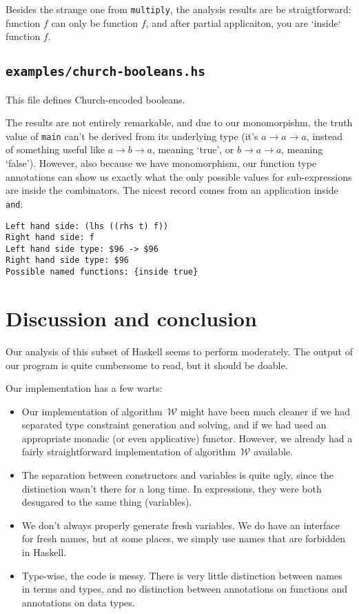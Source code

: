 \documentclass[a4paper]{scrartcl}
\newcommand{\algow}{algorithm~$\mathcal{W}$}
\begin{document}
Besides the strange one from \texttt{multiply}, the analysis results are
be straigtforward: function $f$ can only be function $f$, and after partial
applicaiton, you are `inside` function $f$.

\subsection{\texttt{examples/church-booleans.hs}}

This file defines Church-encoded booleans.

The results are not entirely remarkable, and due to our monomorpishm,
the truth value of \texttt{main} can't be derived from its underlying type
(it's $a \rightarrow a \rightarrow a$, instead of something useful like
$a \rightarrow b \rightarrow a$, meaning `true', or $b \rightarrow a \rightarrow a$,
meaning `false'). However, also because we have monomorphism, our function type
annotations can show us exactly what the only possible values for sub-expressions
are inside the combinators. The nicest record comes from an application inside
\texttt{and}:

\begin{verbatim}
Left hand side: (lhs ((rhs t) f))
Right hand side: f
Left hand side type: $96 -> $96
Right hand side type: $96
Possible named functions: {inside true}
\end{verbatim}

\section{Discussion and conclusion}
Our analysis of this subset of Haskell seems to perform moderately. The output
of our program is quite cumbersome to read, but it should be doable.

Our implementation has a few warts:
\begin{itemize}
\item
    Our implementation of \algow{} might have been much cleaner
    if we had separated type constraint generation and solving,
    and if we had used an appropriate monadic (or even applicative)
    functor. However, we already had a fairly straightforward
    implementation of \algow{} available.
\item
    The separation between constructors and variables is quite ugly,
    since the distinction wasn't there for a long time. In expressions,
    they were both desugared to the same thing (variables).
\item
    We don't always properly generate fresh variables. We do have
    an interface for fresh names, but at some places, we simply use
    names that are forbidden in Haskell.
\item
    Type-wise, the code is messy. There is very little distinction
    between names in terms and types, and no distinction between
    annotations on functions and annotations on data types.
\end{itemize}
\end{document}
